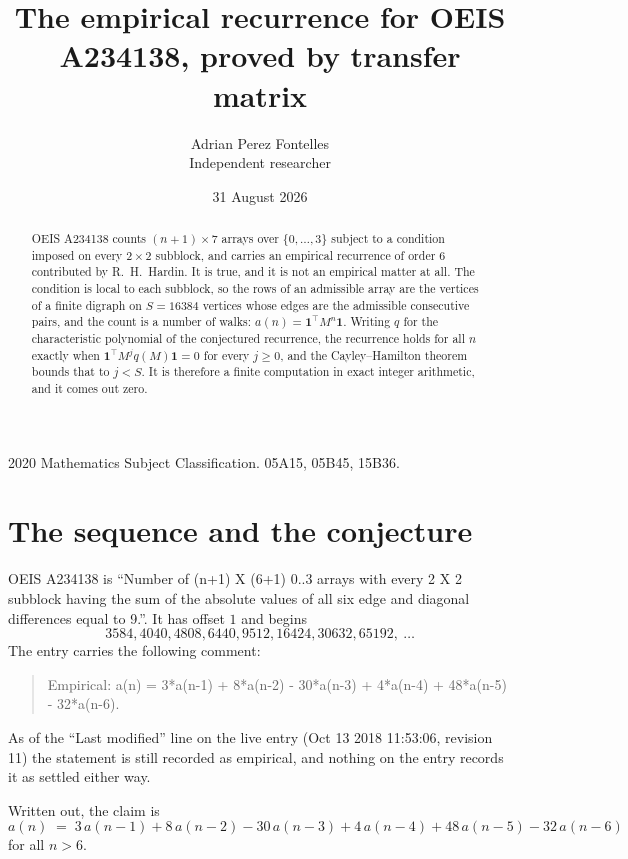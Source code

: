 \documentclass[11pt,a4paper]{article}
\title{The empirical recurrence for OEIS A234138, proved by transfer matrix}
\author{Adrian Perez Fontelles\\ \small Independent researcher}
\date{31 August 2026}
\theoremstyle{plain}
\theoremstyle{definition}
\begin{document}
\maketitle

\begin{abstract}
OEIS A234138 counts $(n+1)\times7$ arrays over $\{0,\dots,3\}$ subject to a condition imposed on
every $2\times2$ subblock, and carries an empirical recurrence of order $6$ contributed
by R.~H.~Hardin. It is true, and it is not an empirical matter at all. The condition is local
to each subblock, so the rows of an admissible array are the vertices of a finite digraph
on $S=16384$ vertices whose edges are the admissible consecutive pairs, and the count is a
number of walks: $a(n)=\mathbf{1}^{\!\top}M^{n}\mathbf{1}$. Writing $q$
for the characteristic polynomial of the conjectured recurrence, the recurrence holds for all
$n$ exactly when $\mathbf{1}^{\!\top}M^{j}q(M)\mathbf{1}=0$ for every $j\ge0$, and the
Cayley--Hamilton theorem bounds that to $j<S$. It is therefore a finite computation in exact
integer arithmetic, and it comes out zero.
\end{abstract}

\noindent\small 2020 Mathematics Subject Classification. 05A15, 05B45, 15B36.\normalsize

\section{The sequence and the conjecture}

OEIS A234138 is ``Number of (n+1) X (6+1) 0..3 arrays with every 2 X 2 subblock having the sum of the absolute values of all six edge and diagonal differences equal to 9.''. It has offset $1$ and begins
\[
3584, 4040, 4808, 6440, 9512, 16424, 30632, 65192,\ \dots
\]
The entry carries the following comment:
\begin{quote}\small
Empirical: a(n) = 3*a(n-1) + 8*a(n-2) - 30*a(n-3) + 4*a(n-4) + 48*a(n-5) - 32*a(n-6).
\end{quote}
As of the ``Last modified'' line on the live entry (Oct 13 2018 11:53:06, revision 11) the statement is
still recorded as empirical, and nothing on the entry records it as settled either way.

Written out, the claim is
\begin{equation}\label{eq:conj}
a(n)\;=\;3\,a(n-1) + 8\,a(n-2) - 30\,a(n-3) + 4\,a(n-4) + 48\,a(n-5) - 32\,a(n-6)
\end{equation}
for all $n>6$.
\end{document}
